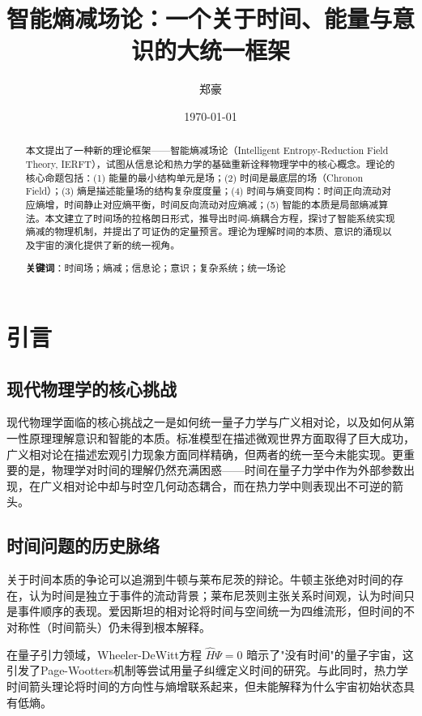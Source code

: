 \documentclass[12pt,a4paper]{article}
\title{智能熵减场论：一个关于时间、能量与意识的大统一框架}
\author{郑豪}
\affiliation{海南大学}
\date{\today}
\begin{document}
\begin{abstract}
本文提出了一种新的理论框架——智能熵减场论（Intelligent Entropy-Reduction Field Theory, IERFT），试图从信息论和热力学的基础重新诠释物理学中的核心概念。理论的核心命题包括：(1) 能量的最小结构单元是场；(2) 时间是最底层的场（Chronon Field）；(3) 熵是描述能量场的结构复杂度度量；(4) 时间与熵变同构：时间正向流动对应熵增，时间静止对应熵平衡，时间反向流动对应熵减；(5) 智能的本质是局部熵减算法。本文建立了时间场的拉格朗日形式，推导出时间-熵耦合方程，探讨了智能系统实现熵减的物理机制，并提出了可证伪的定量预言。理论为理解时间的本质、意识的涌现以及宇宙的演化提供了新的统一视角。

\textbf{关键词}：时间场；熵减；信息论；意识；复杂系统；统一场论
\end{abstract}

\maketitle

\section{引言}

\subsection{现代物理学的核心挑战}

现代物理学面临的核心挑战之一是如何统一量子力学与广义相对论，以及如何从第一性原理理解意识和智能的本质。标准模型在描述微观世界方面取得了巨大成功，广义相对论在描述宏观引力现象方面同样精确，但两者的统一至今未能实现。更重要的是，物理学对时间的理解仍然充满困惑——时间在量子力学中作为外部参数出现，在广义相对论中却与时空几何动态耦合，而在热力学中则表现出不可逆的箭头。

\subsection{时间问题的历史脉络}

关于时间本质的争论可以追溯到牛顿与莱布尼茨的辩论。牛顿主张绝对时间的存在，认为时间是独立于事件的流动背景；莱布尼茨则主张关系时间观，认为时间只是事件顺序的表现。爱因斯坦的相对论将时间与空间统一为四维流形，但时间的不对称性（时间箭头）仍未得到根本解释。

在量子引力领域，Wheeler-DeWitt方程 $\hat{H}\Psi = 0$ 暗示了"没有时间"的量子宇宙，这引发了Page-Wootters机制等尝试用量子纠缠定义时间的研究。与此同时，热力学时间箭头理论\cite{Reichenbach1956,Price1996}将时间的方向性与熵增联系起来，但未能解释为什么宇宙初始状态具有低熵。
\end{document}
